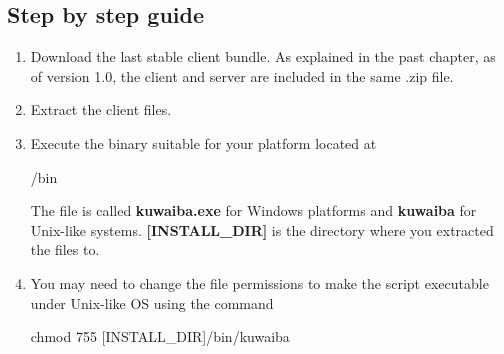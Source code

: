 \documentclass[a4paper]{article}
\begin{document}
				\subsection{Step by step guide}
					\begin{enumerate}
						\item Download the last stable client bundle. As explained in the past chapter, as of version 1.0, the client and server are included in the same .zip file.
						\item Extract the client files.
						\item Execute the binary suitable for your platform located at
						\begin{verbbox}
							/bin
						\end{verbbox}
						\begin{figure}[ht]
							\centering	
							\theverbbox
						\end{figure}
						The file is called \textbf{kuwaiba.exe} for Windows platforms and \textbf{kuwaiba} for Unix-like systems. \textbf{[INSTALL\_DIR]} is the directory where you extracted the files to.
						\item You may need to change the file permissions to make the script executable under Unix-like OS using the command
						\begin{verbbox}
							chmod 755 [INSTALL_DIR]/bin/kuwaiba
						\end{verbbox}
						\begin{figure}[ht]
							\centering	
							\theverbbox
						\end{figure}	
						
					\end{enumerate}
\end{document}

